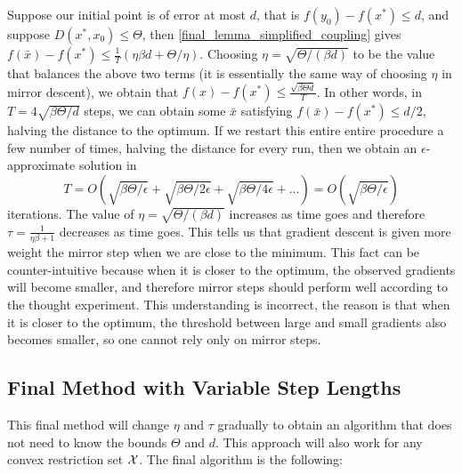 Suppose our initial point is of error at most $d$, that is $f (y_0 ) - f (x^\ast ) \leq d$, and suppose $D(x^\ast, {x_0}) \leq \Theta$, then \eqref{final_lemma_simplified_coupling} gives $f (\bar{x})-f (x^\ast ) \leq \frac{1}{T}\left( \eta \beta d + \Theta/\eta\right)$. Choosing $\eta = \sqrt{\Theta/(\beta d)}$ to be the value that balances the above two terms (it is essentially the same way of choosing $\eta$ in mirror descent), we obtain that $f (x) - f (x^\ast ) \leq \frac{\sqrt{\beta \Theta d}}{T}$. In other words, in $T = 4 \sqrt{\beta\Theta/d}$ steps, we can obtain some $\bar{x}$ satisfying $f (\bar{x}) - f (x^\ast ) \leq d/2$, halving the distance to the optimum. If we restart this entire entire procedure a few number of times, halving the distance for every run, then we obtain an $\epsilon$-approximate solution in
\[
    T = O \left(\sqrt{\beta \Theta / \epsilon} + \sqrt{\beta \Theta / 2\epsilon} + \sqrt{\beta \Theta / 4 \epsilon} + \dots \right) = O\left(\sqrt{\beta\Theta / \epsilon}  \right)
\]
iterations. The value of $\eta = \sqrt{\Theta/(\beta d)}$ increases as time goes and therefore $\tau = \frac{1}{\eta \beta +1}$ decreases as time goes. This tells us that gradient descent is given more weight the mirror step when we are close to the minimum.  This fact can be counter-intuitive because when it is closer to the optimum, the observed gradients will become smaller, and therefore mirror steps should perform well according to the thought experiment. This understanding is incorrect, the reason is that when it is closer to the optimum, the threshold between large and small gradients also becomes smaller, so one cannot rely only on mirror steps.

\subsection{Final Method with Variable Step Lengths}
This final method will change $\eta$ and $\tau$ gradually to obtain an algorithm that does not need to know the bounds $\Theta$ and $d$. This approach will also work for any convex restriction set $\mathcal{X}$. The final algorithm is the following:

